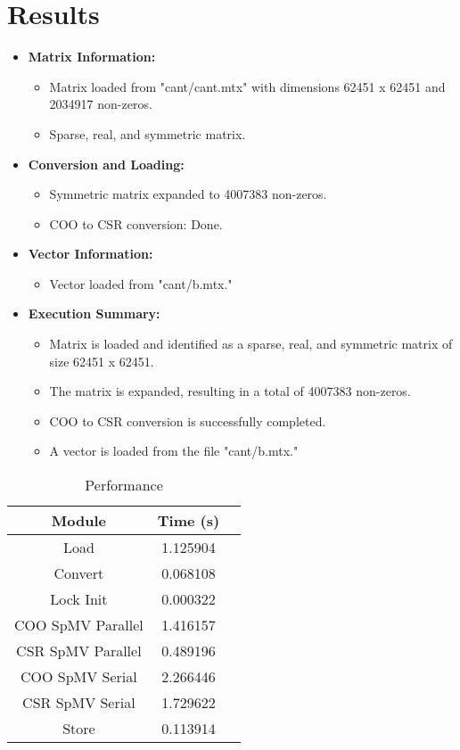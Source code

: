 \documentclass[11pt, twocolumn]{article}
\begin{document}
\section{Results}

\begin{itemize}
  \item \textbf{Matrix Information:}
    \begin{itemize}
      \item Matrix loaded from "cant/cant.mtx" with dimensions 62451 x 62451 and 2034917 non-zeros.
      \item Sparse, real, and symmetric matrix.
    \end{itemize}
  
  \item \textbf{Conversion and Loading:}
    \begin{itemize}
      \item Symmetric matrix expanded to 4007383 non-zeros.
      \item COO to CSR conversion: Done.
    \end{itemize}
  
  \item \textbf{Vector Information:}
    \begin{itemize}
      \item Vector loaded from "cant/b.mtx."
    \end{itemize}
  
  \item \textbf{Execution Summary:}
    \begin{itemize}
      \item Matrix is loaded and identified as a sparse, real, and symmetric matrix of size 62451 x 62451.
      \item The matrix is expanded, resulting in a total of 4007383 non-zeros.
      \item COO to CSR conversion is successfully completed.
      \item A vector is loaded from the file "cant/b.mtx."
    \end{itemize}
  
\end{itemize}


\begin{table}[H]
    \centering
    \begin{tabular}{|c|c|c|}
    \hline
    Module & Time (s)  \\
    \hline
    Load & 1.125904  \\
    Convert & 0.068108  \\
    Lock Init & 0.000322  \\
    COO SpMV Parallel & 1.416157  \\
    CSR SpMV Parallel & 0.489196  \\
    COO SpMV Serial & 2.266446  \\
    CSR SpMV Serial & 1.729622  \\
    Store & 0.113914 \\
    
    \hline
    \end{tabular}
    \caption{Performance}
\end{table}
\end{document}
